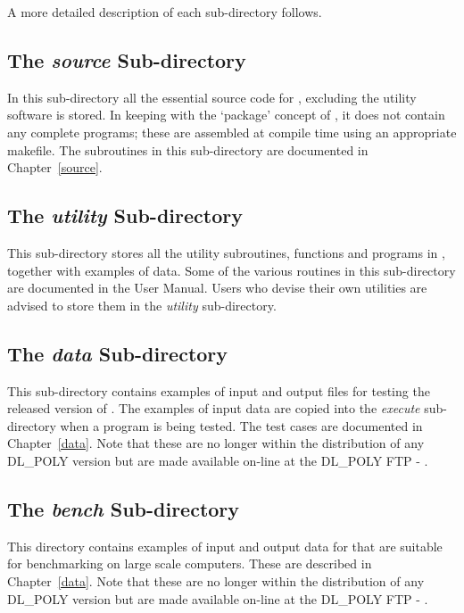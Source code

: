\noindent A more detailed description of each sub-directory
follows.

\subsection{The {\em source} Sub-directory}

In this sub-directory all the essential source code for \D,
excluding the utility software is stored.  In keeping with the
`package' concept of \D, it does not contain any complete
programs; these are assembled at compile time using an appropriate
makefile.  The subroutines in this sub-directory are documented in
Chapter~\ref{source}.

\subsection{The {\em utility} Sub-directory}

This sub-directory stores all the utility subroutines, functions and
programs in \D, together with examples of data.  Some of the various
routines in this sub-directory are documented in the \C
User Manual.  Users who devise their own utilities are advised
to store them in the {\em utility} sub-directory.

\subsection{The {\em data} Sub-directory}

This sub-directory contains examples of input and output files for
testing the released version of \D.  The examples of input data
are copied into the {\em execute} sub-directory when a program is
being tested.  The test cases are documented in Chapter~\ref{data}.
Note that these are no longer within the distribution of any
DL\_POLY version but are made available on-line at the DL\_POLY FTP
- \FTP{}.

\subsection{The {\em bench} Sub-directory}

This directory contains examples of input and output data for \D
that are suitable for benchmarking \D on large scale computers.
These are described in Chapter~\ref{data}. Note that these are no
longer within the distribution of any DL\_POLY version but
are made available on-line at the DL\_POLY FTP - \FTP{}.

